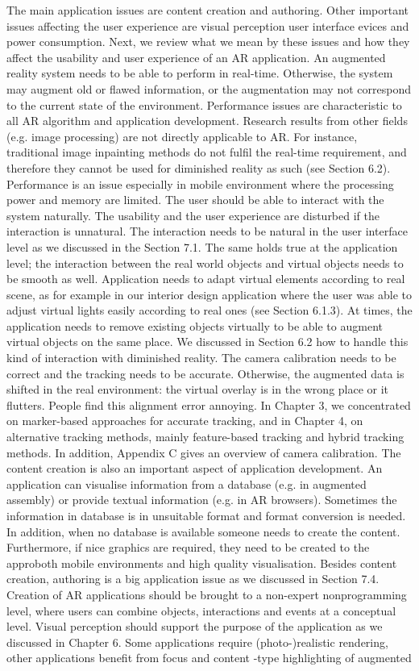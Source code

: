 The main application issues are content creation and authoring. Other important issues affecting the user experience are visual perception user interface evices and power consumption. Next, we review what we mean by these issues and how they affect the usability and user experience of an AR application. An augmented reality system needs to be able to perform in real-time. Otherwise, the system may augment old or flawed information, or the augmentation may not correspond to the current state of the environment. Performance issues are characteristic to all AR algorithm and application development. Research results from other fields (e.g. image processing) are not directly applicable to AR. For instance, traditional image inpainting methods do not fulfil the real-time requirement, and therefore they cannot be used for diminished reality as such (see Section 6.2). Performance is an issue especially in mobile environment where the processing power and memory are limited. The user should be able to interact with the system naturally. The usability and the user experience are disturbed if the interaction is unnatural. The interaction needs to be natural in the user interface level as we discussed in the Section 7.1. The same holds true at the application level; the interaction between the real world objects and virtual objects needs to be smooth as well. Application needs to adapt virtual elements according to real scene, as for example in our interior design application where the user was able to adjust virtual lights easily according to real ones (see Section 6.1.3). At times, the application needs to remove existing objects virtually to be able to augment virtual objects on the same place. We discussed in Section 6.2 how to handle this kind of interaction with diminished reality. The camera calibration needs to be correct and the tracking needs to be accurate. Otherwise, the augmented data is shifted in the real environment: the virtual overlay is in the wrong place or it flutters. People find this alignment error annoying. In Chapter 3, we concentrated on marker-based approaches for accurate tracking, and in Chapter 4, on alternative tracking methods, mainly feature-based tracking and hybrid tracking methods. In addition, Appendix C gives an overview of camera calibration. The content creation is also an important aspect of application development. An application can visualise information from a database (e.g. in augmented assembly) or provide textual information (e.g. in AR browsers). Sometimes the information in database is in unsuitable format and format conversion is needed. In addition, when no database is available someone needs to create the content. Furthermore, if nice graphics are required, they need to be created to the approboth mobile environments and high quality visualisation. Besides content creation, authoring is a big application issue as we discussed in Section 7.4. Creation of AR applications should be brought to a non-expert nonprogramming level, where users can combine objects, interactions and events at a conceptual level. Visual perception should support the purpose of the application as we discussed in Chapter 6. Some applications require (photo-)realistic rendering, other applications benefit from focus and content -type highlighting of augmented 